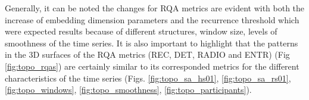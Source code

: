 Generally, it can be noted the changes for RQA metrics are evident
with both the increase of embedding dimension parameters and the 
recurrence threshold which were expected results 
because of different structures, window size, levels of smoothness 
of the time series. 
It is also important to highlight that the patterns in the 3D 
surfaces of the RQA metrics (REC, DET, RADIO and ENTR) 
(Fig \ref{fig:topo_rqas}) are certainly similar to its corresponded
metrics for the different characteristics of the time series  
(Figs. \ref{fig:topo_sa_hs01}, \ref{fig:topo_sa_rs01}, 
\ref{fig:topo_windows}, \ref{fig:topo_smoothness}, 
\ref{fig:topo_participants}).




	




